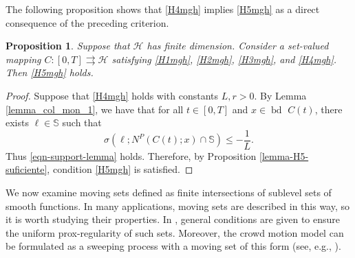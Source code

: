 \documentclass[preprint,12pt]{elsarticle}
\renewcommand{\H}{\mathcal{H}}
\newcommand{\tto}{\rightrightarrows}
\newcommand{\bd}{{\operatorname{bd \ }}}
\theoremstyle{plain}
\newtheorem{proposition}[theorem]{Proposition}
\theoremstyle{definition}
\theoremstyle{remark}
\begin{document}
The following proposition shows that \ref{H4mgh} implies \ref{H5mgh} as a direct consequence of the preceding criterion.
	\begin{proposition}\label{prop_col_lions}
		Suppose that $\H$ has finite dimension. Consider a set-valued mapping $C\colon [0,T]\tto \H$ satisfying \ref{H1mgh}, \ref{H2mgh}, \ref{H3mgh}, and \ref{H4mgh}. Then \ref{H5mgh} holds.
	\end{proposition}
	\begin{proof}
		Suppose that \ref{H4mgh} holds with constants $L,r>0$. By Lemma \ref{lemma_col_mon_1}, we have that for all $t\in [0,T]$ and $x\in \bd C(t)$, there exists $\ell\in \mathbb{S}$ such that 
        $$\sigma(\ell;N^P(C(t);x)\cap \mathbb{S})\leq -\frac{1}{L}.
        $$
        Thus \eqref{eqn-support-lemma} holds. Therefore, by Proposition \ref{lemma-H5-suficiente}, condition \ref{H5mgh} is satisfied.
	\end{proof}
	
    
    
    We now examine moving sets defined as finite intersections of sublevel sets of smooth functions. In many applications, moving sets are described in this way, so it is worth studying their properties. In \cite{MR3458154}, general conditions are given to ensure the uniform prox-regularity of such sets. Moreover, the crowd motion model can be formulated as a sweeping process with a moving set of this form (see, e.g., \cite{MR2800713, MR2812587, MR866273}).  
    
\end{document}
